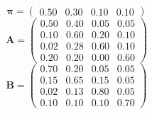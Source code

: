 \begin{equation}
\boldsymbol{\pi}=\begin{pmatrix} \text{0.50} & \text{0.30} & \text{0.10} & \text{0.10} \end{pmatrix}
\end{equation}
\begin{equation}
\mathbf{A}=\begin{pmatrix}
\text{0.50} & \text{0.40} & \text{0.05} & \text{0.05} \\
\text{0.10} & \text{0.60} & \text{0.20} & \text{0.10} \\
\text{0.02} & \text{0.28} & \text{0.60} & \text{0.10} \\
\text{0.20} & \text{0.20} & \text{0.00} & \text{0.60}
\end{pmatrix}
\end{equation}
\begin{equation}
\mathbf{B}=\begin{pmatrix}
\text{0.70} & \text{0.20} & \text{0.05} & \text{0.05} \\
\text{0.15} & \text{0.65} & \text{0.15} & \text{0.05} \\
\text{0.02} & \text{0.13} & \text{0.80} & \text{0.05} \\
\text{0.10} & \text{0.10} & \text{0.10} & \text{0.70}
\end{pmatrix}
\end{equation}
